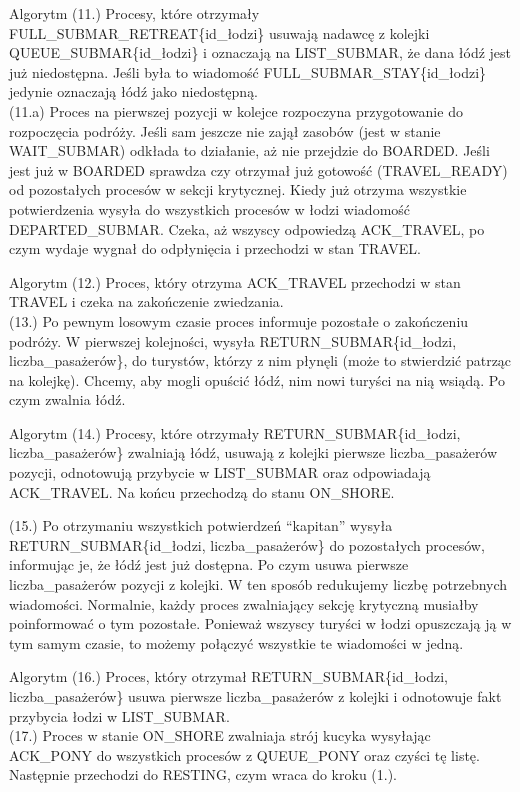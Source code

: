 \documentclass{beamer}
\begin{document}
\begin{frame}{Algorytm}
    \internallinenumbers
    (11.) Procesy, które otrzymały FULL\_SUBMAR\_RETREAT\{id\_łodzi\} usuwają nadawcę z kolejki QUEUE\_SUBMAR\{id\_łodzi\} i oznaczają na LIST\_SUBMAR, że dana łódź jest już niedostępna. Jeśli była to wiadomość FULL\_SUBMAR\_STAY\{id\_łodzi\} jedynie oznaczają łódź jako niedostępną. \\

    (11.a) Proces na pierwszej pozycji w kolejce rozpoczyna przygotowanie do rozpoczęcia podróży. Jeśli sam jeszcze nie zajął zasobów (jest w stanie WAIT\_SUBMAR) odkłada to działanie, aż nie przejdzie do BOARDED. Jeśli jest już w BOARDED sprawdza czy otrzymał już gotowość (TRAVEL\_READY) od pozostałych procesów w sekcji krytycznej. Kiedy już otrzyma wszystkie potwierdzenia wysyła do wszystkich procesów w łodzi wiadomość DEPARTED\_SUBMAR. Czeka, aż wszyscy odpowiedzą ACK\_TRAVEL, po czym wydaje wygnał do odpłynięcia i przechodzi w stan TRAVEL.
\end{frame}

\begin{frame}{Algorytm}
    \internallinenumbers
    (12.) Proces, który otrzyma ACK\_TRAVEL przechodzi w stan TRAVEL i czeka na zakończenie zwiedzania. \\

    (13.) Po pewnym losowym czasie proces informuje pozostałe o zakończeniu podróży. W pierwszej kolejności, wysyła RETURN\_SUBMAR\{id\_łodzi, liczba\_pasażerów\}, do turystów, którzy z nim płynęli (może to stwierdzić patrząc na kolejkę). Chcemy, aby mogli opuścić łódź, nim nowi turyści na nią wsiądą. Po czym zwalnia łódź.
\end{frame}

\begin{frame}{Algorytm}
    \internallinenumbers
    (14.) Procesy, które otrzymały RETURN\_SUBMAR\{id\_łodzi, liczba\_pasażerów\} zwalniają łódź, usuwają z kolejki pierwsze liczba\_pasażerów pozycji, odnotowują przybycie w LIST\_SUBMAR oraz odpowiadają ACK\_TRAVEL. Na końcu przechodzą do stanu ON\_SHORE.

    (15.) Po otrzymaniu wszystkich potwierdzeń ``kapitan'' wysyła RETURN\_SUBMAR\{id\_łodzi, liczba\_pasażerów\} do pozostałych procesów, informując je, że łódź jest już dostępna. Po czym usuwa pierwsze liczba\_pasażerów pozycji z kolejki. W ten sposób redukujemy liczbę potrzebnych wiadomości. Normalnie, każdy proces zwalniający sekcję krytyczną musiałby poinformować o tym pozostałe. Ponieważ wszyscy turyści w łodzi opuszczają ją w tym samym czasie, to możemy połączyć wszystkie te wiadomości w jedną.
\end{frame}

\begin{frame}{Algorytm}
    \internallinenumbers
    (16.) Proces, który otrzymał RETURN\_SUBMAR\{id\_łodzi, liczba\_pasażerów\} usuwa pierwsze liczba\_pasażerów z kolejki i odnotowuje fakt przybycia łodzi w LIST\_SUBMAR.\\
    (17.) Proces w stanie ON\_SHORE zwalniaja strój kucyka wysyłając ACK\_PONY do wszystkich procesów z QUEUE\_PONY oraz czyści tę listę. Następnie przechodzi do RESTING, czym wraca do kroku (1.).
\end{frame}
\end{document}
